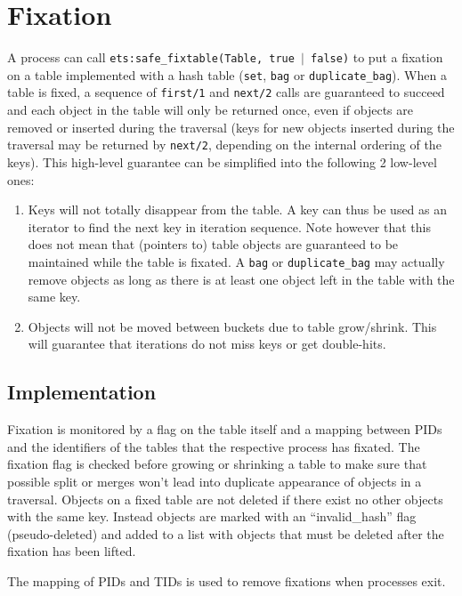 \documentclass[aps,pre,preprint,nofootinbib]{revtex4}
\begin{document}
\section{Fixation}
\label{sec:fixation}

A process can call \texttt{ets:safe\_fixtable(Table, true $|$ false)} to put a fixation on a table implemented with a hash table (\verb|set|, \verb|bag| or \verb|duplicate_bag|).
When a table is fixed, a sequence of \verb|first/1| and \verb|next/2| calls are guaranteed to succeed and each object in the table will only be returned once, even if objects are removed or inserted during the traversal (keys for new objects inserted during the traversal may be returned by \verb|next/2|, depending on the internal ordering of the keys).
This high-level guarantee can be simplified into the following 2 low-level ones:

\begin{enumerate}
\item Keys will not totally disappear from the table.
  A key can thus be used as an iterator to find the next key in iteration sequence.
  Note however that this does not mean that (pointers to) table objects are guaranteed to be maintained while the table is fixated.
  A \verb|bag| or \verb|duplicate_bag| may actually remove objects as long as there is at least one object left in the table with the same key.
\item Objects will not be moved between buckets due to table grow/shrink.
  This will guarantee that iterations do not miss keys or get double-hits.
\end{enumerate}

\subsection{Implementation}

Fixation is monitored by a flag on the table itself and a mapping between PIDs and the identifiers of the tables that the respective process has fixated.
The fixation flag is checked before growing or shrinking a table to make sure that possible split or merges won't lead into duplicate appearance of objects in a traversal.
Objects on a fixed table are not deleted if there exist no other objects with the same key.
Instead objects are marked with an ``invalid\_hash'' flag (pseudo-deleted) and added to a list with objects that must be deleted after the fixation has been lifted.

The mapping of PIDs and TIDs is used to remove fixations when processes exit.
\end{document}
